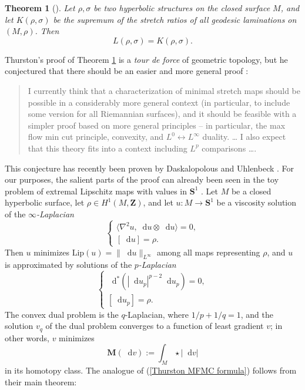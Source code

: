 \documentclass[reqno,11pt]{amsart}
\newcommand{\ZZ}{\mathbf{Z}}
\newcommand{\Sph}{\mathbf S}
\newcommand*\dif{\mathop{}\!\mathrm{d}}
\newcommand{\Lip}{\mathrm{Lip}}
\newcommand{\Mass}{\mathbf M}
\newcommand{\dfn}[1]{\emph{#1}\index{#1}}
\newtheorem{theorem}{Theorem}[section]
\theoremstyle{definition}
\numberwithin{equation}{section}
\begin{document}
\begin{theorem}[{\cite{Thurston98}}]\label{Thurston MFMC}
Let $\rho, \sigma$ be two hyperbolic structures on the closed surface $M$, and let $K(\rho, \sigma)$ be the supremum of the stretch ratios of all geodesic laminations on $(M, \rho)$.
Then 
\begin{equation}\label{Thurston MFMC formula}
L(\rho, \sigma) = K(\rho, \sigma).
\end{equation}
\end{theorem}

Thurston's proof of Theorem \ref{Thurston MFMC} is a \emph{tour de force} of geometric topology, but he conjectured that there should be an easier and more general proof \cite[Abstract]{Thurston98}:

\begin{quote}
I currently think that a characterization of minimal stretch maps should be possible in a considerably more general context (in particular, to include some version for all Riemannian surfaces), and it should be feasible with a simpler proof based on more general principles -- in particular, the max flow min cut principle, convexity, and $L^0 \leftrightarrow L^\infty$ duality. \dots
I also expect that this theory fits into a context including $L^p$ comparisons \dots. 
\end{quote}

This conjecture has recently been proven by Daskalopolous and Uhlenbeck \cite{daskalopoulos2022,daskalopoulos2023,uhlenbeck2023noether}.
For our purposes, the salient parts of the proof can already been seen in the toy problem of extremal Lipschitz maps with values in $\Sph^1$ \cite{daskalopoulos2020transverse}.
Let $M$ be a closed hyperbolic surface, let $\rho \in H^1(M, \ZZ)$, and let $u: M \to \Sph^1$ be a viscosity solution of the \dfn{$\infty$-Laplacian}
\begin{equation}\label{infinity laplacian}\begin{cases}
\langle \nabla^2 u, \dif u \otimes \dif u\rangle = 0, \\
[\dif u] = \rho.
\end{cases}\end{equation}
Then $u$ minimizes $\Lip(u) = \|\dif u\|_{L^\infty}$ among all maps representing $\rho$, and $u$ is approximated by solutions of the \dfn{$p$-Laplacian}
$$\begin{cases}
\dif^*(|\dif u_p|^{p - 2} \dif u_p) = 0, \\
[\dif u_p] = \rho.
\end{cases}$$
The convex dual problem is the $q$-Laplacian, where $1/p + 1/q = 1$, and the solution $v_q$ of the dual problem converges to a function of least gradient $v$; in other words, $v$ minimizes 
$$\Mass(\dif v) := \int_M \star |\dif v|$$
in its homotopy class. 
The analogue of (\ref{Thurston MFMC formula}) follows from their main theorem:
\end{document}
